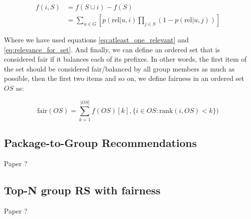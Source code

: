 \begin{equation} \label{eq:relevance_for_set_add}
\begin{aligned}
    f(i, S) &= f(S \cup {i}) - f(S) \\
    & = \sum_{u \in G}{\left[p(\textrm{rel}|u, i) \prod_{j \in S}{(1 - p(\textrm{rel}|u, j))}\right]}
\end{aligned}
\end{equation}

Where we have used equations \ref{eq:atleast_one_relevant} and \ref{eq:relevance_for_set}. And finally, we can define an ordered set that is considered fair if it balances each of its prefixes. In other words, the first item of the set should be considered fair/balanced by all group members as much as possible, then the first two items and so on, we define fairness in an ordered set $OS$ as:

\begin{equation}
    \textrm{fair}(OS) = \sum_{k=1}^{|OS|}{f(OS)[k], \{i \in OS : \textrm{rank}(i, OS) < k\})}
\end{equation}


\subsection{Package-to-Group Recommendations}
Paper \cite{serbos_2017_fairness_packages_to_group_rec}?


\subsection{Top-N group RS with fairness}
Paper \cite{sacharidis_2019_top_n_with_fairness}?
